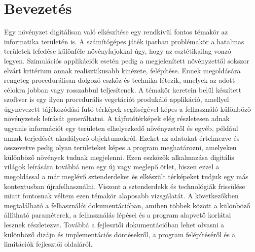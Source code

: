\chapter{Bevezetés}
\label{ch:intro}

Egy növényzet digitálisan való elkészítése egy rendkívül fontos témakör az informatika területén is. A számítógépes játék iparban problémakör a hatalmas területek lefedése különféle növényfajokkal úgy, hogy az esztétikailag vonzó legyen. Szimulációs applikációk esetén pedig a megjelenített növényzettől sokszor elvárt kritérium annak realisztikusabb kinézete, felépítése.  Ennek megoldására rengeteg procedurálisan dolgozó eszköz és technika létezik, amelyek az adott célokra jobban vagy rosszabbul teljesítenek.
\newline
A témakör keretein belül készített szoftver is egy ilyen procedurális vegetációt produkáló applikáció, amellyel úgynevezett tájékozódási futó térképek segítségével képes a felhasználó különböző növényzetek leírását generáltatni. A tájfutótérképek elég részletesen adnak ugyanis információt egy területen elhelyezkedő növényzetről és egyéb, például annak terjedését akadályozó objektumokról. Ezeket az adatokat értelmezve és összevetve pedig olyan területeket képes a program meghatározni, amelyeken különböző növények tudnak megjelenni.
\newline
Ezen eszközök alkalmazása digitális világok leírására továbbá nem egy új vagy meglepő ötlet, hiszen ezzel a megoldással a már meglévő sztenderdeket és elkészült térképeket tudjuk egy más kontextusban újrafelhasználni. Viszont a sztenderdekk és technológiák frissülése miatt fontosnak véltem ezen témakör alaposabb vizsgálatát.
\newline 
A következőkben megtalálható a felhasználói dokumentációban, amiben többek között a különböző állítható paraméterek, a felhasználás lépései és a program alapvető korlátai lesznek részletezve. Továbbá a fejlesztői dokumentációban lehet olvasni a különböző dizájn és implementációs döntésekről, a program felépítéséről és a limitációk fejlesztői oldaláról.  


